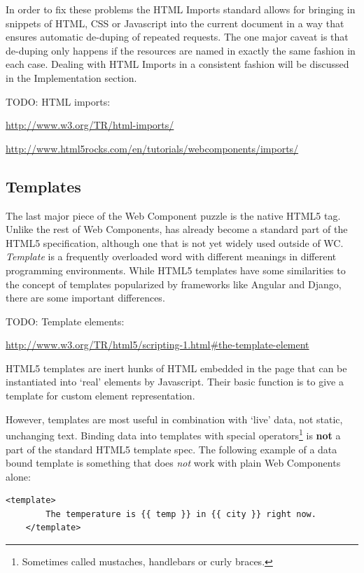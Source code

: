 In order to fix these problems the HTML Imports standard allows for bringing in snippets of HTML, CSS or Javascript into the current document in a way that ensures automatic de-duping of repeated requests.
The one major caveat is that de-duping only happens if the resources are named in exactly the same fashion in each case.
Dealing with HTML Imports in a consistent fashion will be discussed in the Implementation section.

TODO: HTML imports:

\url{http://www.w3.org/TR/html-imports/}

\url{http://www.html5rocks.com/en/tutorials/webcomponents/imports/}


\subsection{Templates}
The last major piece of the Web Component puzzle is the native HTML5  tag. 
Unlike the rest of Web Components,  has already become a standard part of the HTML5 specification, although one that is not yet widely used outside of WC.
\textit{Template} is a frequently overloaded word with different meanings in different programming environments.
While HTML5 templates have some similarities to the concept of templates popularized by frameworks like Angular and Django, there are some important differences.

TODO: Template elements:

\url{http://www.w3.org/TR/html5/scripting-1.html#the-template-element}

HTML5 templates are inert hunks of HTML embedded in the page that can be instantiated into `real' elements by Javascript.
Their basic function is to give a template for custom element representation.

However, templates are most useful in combination with `live' data, not static, unchanging text.
Binding data into templates with special operators\footnote{
Sometimes called mustaches, handlebars or curly braces. }
is \textbf{not} a part of the standard HTML5 template spec.
The following example of a data bound template is something that does \textit{not} work with plain Web Components alone:

\begin{lstlisting}[language=HTML5,numbers=none]
	<template> 
		The temperature is {{ temp }} in {{ city }} right now.
	</template>
\end{lstlisting}

